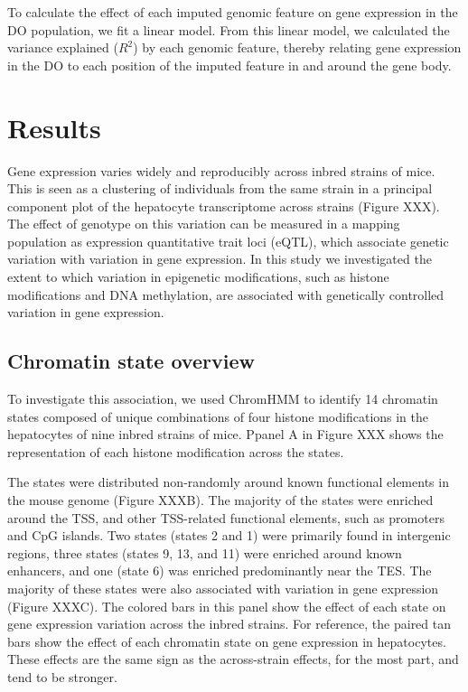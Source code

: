 \documentclass[10pt,letterpaper]{article}
\begin{document}
To calculate the effect of each imputed genomic feature on gene
expression in the DO population, we fit a linear model. From this linear
model, we calculated the variance explained (\(R^2\)) by each genomic
feature, thereby relating gene expression in the DO to each position of
the imputed feature in and around the gene body.

\hypertarget{results}{%
\section{Results}\label{results}}

Gene expression varies widely and reproducibly across inbred strains of
mice. This is seen as a clustering of individuals from the same strain
in a principal component plot of the hepatocyte transcriptome across
strains (Figure XXX). The effect of genotype on this variation can be
measured in a mapping population as expression quantitative trait loci
(eQTL), which associate genetic variation with variation in gene
expression. In this study we investigated the extent to which variation
in epigenetic modifications, such as histone modifications and DNA
methylation, are associated with genetically controlled variation in
gene expression.

\hypertarget{chromatin-state-overview}{%
\subsection{Chromatin state overview}\label{chromatin-state-overview}}

To investigate this association, we used ChromHMM to identify 14
chromatin states composed of unique combinations of four histone
modifications in the hepatocytes of nine inbred strains of mice. Ppanel
A in Figure XXX shows the representation of each histone modification
across the states.

The states were distributed non-randomly around known functional
elements in the mouse genome (Figure XXXB). The majority of the states
were enriched around the TSS, and other TSS-related functional elements,
such as promoters and CpG islands. Two states (states 2 and 1) were
primarily found in intergenic regions, three states (states 9, 13, and
11) were enriched around known enhancers, and one (state 6) was enriched
predominantly near the TES. The majority of these states were also
associated with variation in gene expression (Figure XXXC). The colored
bars in this panel show the effect of each state on gene expression
variation across the inbred strains. For reference, the paired tan bars
show the effect of each chromatin state on gene expression in
hepatocytes. These effects are the same sign as the across-strain
effects, for the most part, and tend to be stronger.
\end{document}
